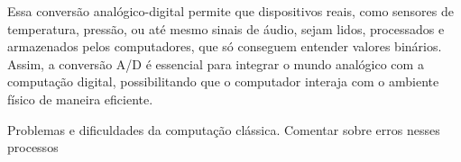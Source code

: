 Essa conversão analógico-digital permite que dispositivos reais, como sensores de temperatura, pressão, ou até mesmo sinais de áudio, sejam lidos, processados e armazenados pelos computadores, que só conseguem entender valores binários. Assim, a conversão A/D é essencial para integrar o mundo analógico com a computação digital, possibilitando que o computador interaja com o ambiente físico de maneira eficiente.

{\color{red} Problemas e dificuldades da computação clássica. Comentar sobre erros nesses processos}




\newpage

